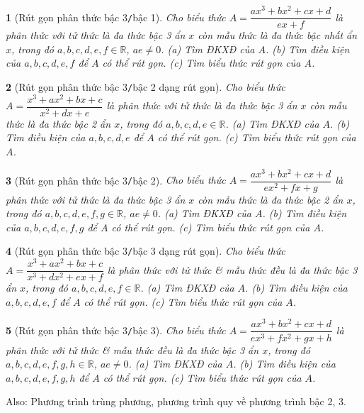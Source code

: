 \documentclass{article}
\newtheorem{baitoan}{}
\begin{document}
\begin{baitoan}[Rút gọn phân thức bậc 3{\tt/}bậc 1]
	Cho biểu thức $A = \dfrac{ax^3 + bx^2 + cx + d}{ex + f}$ là phân thức với tử thức là đa thức bậc 3 ẩn $x$ còn mẫu thức là đa thức bậc nhất ẩn $x$, trong đó $a,b,c,d,e,f\in\mathbb{R}$, $ae\ne0$. (a) Tìm {\rm ĐKXĐ} của $A$. (b) Tìm điều kiện của $a,b,c,d,e,f$ để $A$ có thể rút gọn. (c) Tìm biểu thức rút gọn của $A$.
\end{baitoan}

\begin{baitoan}[Rút gọn phân thức bậc 3{\tt/}bậc 2 dạng rút gọn]
	Cho biểu thức $A = \dfrac{x^3 + ax^2 + bx + c}{x^2 + dx + e}$ là phân thức với tử thức là đa thức bậc 3 ẩn $x$ còn mẫu thức là đa thức bậc 2 ẩn $x$, trong đó $a,b,c,d,e\in\mathbb{R}$. (a) Tìm {\rm ĐKXĐ} của $A$. (b) Tìm điều kiện của $a,b,c,d,e$ để $A$ có thể rút gọn. (c) Tìm biểu thức rút gọn của $A$.
\end{baitoan}

\begin{baitoan}[Rút gọn phân thức bậc 3{\tt/}bậc 2]
	Cho biểu thức $A = \dfrac{ax^3 + bx^2 + cx + d}{ex^2 + fx + g}$ là phân thức với tử thức là đa thức bậc 3 ẩn $x$ còn mẫu thức là đa thức bậc 2 ẩn $x$, trong đó $a,b,c,d,e,f,g\in\mathbb{R}$, $ae\ne0$. (a) Tìm {\rm ĐKXĐ} của $A$. (b) Tìm điều kiện của $a,b,c,d,e,f,g$ để $A$ có thể rút gọn. (c) Tìm biểu thức rút gọn của $A$.
\end{baitoan}

\begin{baitoan}[Rút gọn phân thức bậc 3{\tt/}bậc 3 dạng rút gọn]
	Cho biểu thức $A = \dfrac{x^3 + ax^2 + bx + c}{x^3 + dx^2 + ex + f}$ là phân thức với tử thức \& mẫu thức đều là đa thức bậc 3 ẩn $x$, trong đó $a,b,c,d,e,f\in\mathbb{R}$. (a) Tìm {\rm ĐKXĐ} của $A$. (b) Tìm điều kiện của $a,b,c,d,e,f$ để $A$ có thể rút gọn. (c) Tìm biểu thức rút gọn của $A$.
\end{baitoan}

\begin{baitoan}[Rút gọn phân thức bậc 3{\tt/}bậc 3]
	Cho biểu thức $A = \dfrac{ax^3 + bx^2 + cx + d}{ex^3 + fx^2 + gx + h}$ là phân thức với tử thức \& mẫu thức đều là đa thức bậc 3 ẩn $x$, trong đó $a,b,c,d,e,f,g,h\in\mathbb{R}$, $ae\ne0$. (a) Tìm {\rm ĐKXĐ} của $A$. (b) Tìm điều kiện của $a,b,c,d,e,f,g,h$ để $A$ có thể rút gọn. (c) Tìm biểu thức rút gọn của $A$.
\end{baitoan}
Also: Phương trình trùng phương, phương trình quy về phương trình bậc 2, 3.
\end{document}
